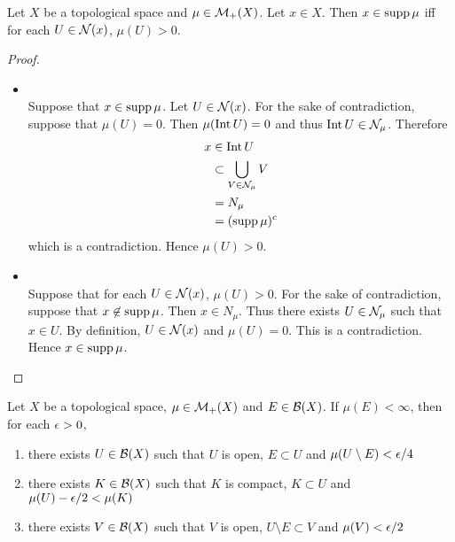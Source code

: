 \documentclass{book}
\begin{document}
	\begin{ex} 
		Let $X$ be a topological space and $\mu \in \mathcal{M}_+(X)$. Let $x \in X$. Then $x \in \operatorname{supp} \mu$ iff for each $U \in \mathcal{N}(x)$, $\mu(U) > 0$.
	\end{ex}

	\begin{proof}\
		\begin{itemize}
			\item \tbf{$(\implies)$: } \\
			Suppose that $x \in \operatorname{supp} \mu$. Let $U \in \mathcal{N}(x)$. For the sake of contradiction, suppose that $\mu(U) = 0$. Then $\mu(\operatorname{Int} U) = 0$ and thus $\operatorname{Int} U \in \mathcal{N}_{\mu}$. Therefore
			\begin{align*}
				x
				& \in \operatorname{Int} U \\
				& \subset \bigcup_{V \in \mathcal{N}_{\mu}} V \\
				& = N_{\mu} \\
				& = (\operatorname{supp} \mu)^c 
			\end{align*}
			which is a contradiction. Hence $\mu(U) > 0$. 
			\item \tbf{$(\impliedby)$: } \\
			Suppose that for each $U \in \mathcal{N}(x)$, $\mu(U) > 0$. For the sake of contradiction, suppose that $x \not \in \operatorname{supp} \mu$. Then $x \in N_{\mu}$. Thus there exists $U \in \mathcal{N}_{\mu}$ such that $x \in U$. By definition, $U \in \mathcal{N}(x)$ and $\mu(U) = 0$. This is a contradiction. Hence $x \in \operatorname{supp} \mu$. 
		\end{itemize}
	\end{proof}

	\begin{ex}  
		Let $X$ be a topological space, $\mu \in \mathcal{M}_+(X)$ and $E \in \mathcal{B}(X)$. If $\mu(E) < \infty$, then for each $\epsilon >0$, 
		\begin{enumerate}
			\item there exists $U \in \mathcal{B}(X)$ such that $U$ is open, $E \subset U$ and $\mu(U \setminus E) < \epsilon/4$ 
			\item there exists $K \in \mathcal{B}(X)$ such that $K$ is compact, $K \subset U$ and $\mu(U) - \epsilon/2 < \mu(K)$ 
			\item there exists $V \in \mathcal{B}(X)$ such that $V$ is open, $U \setminus E \subset V$ and $\mu(V) < \epsilon/2$ 
		\end{enumerate}
	\end{ex}
	
\end{document}
